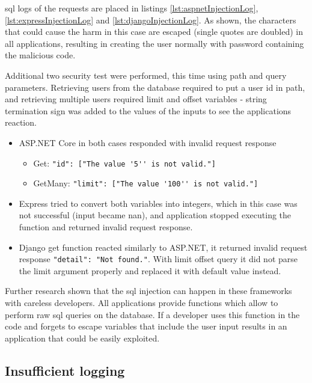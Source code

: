\acrshort{sql} logs of the requests are placed in listings \ref{lst:aspnetInjectionLog}, \ref{lst:expressInjectionLog} and \ref{lst:djangoInjectionLog}. As shown, the characters that could cause the harm in this case are escaped (single quotes are doubled) in all applications, resulting in creating the user normally with password containing the malicious code.




Additional two security test were performed, this time using path and query parameters. Retrieving users from the database required to put a user id in path, and retrieving multiple users required limit and offset variables - string termination sign was added to the values of the inputs to see the applications reaction.



\begin{itemize}
      \item ASP.NET Core in both cases responded with invalid request response
            \begin{itemize}
                  \item Get: \lstinline{"id": ["The value '5'' is not valid."]}
                  \item GetMany: \lstinline{"limit": ["The value '100'' is not valid."]}
            \end{itemize}
      \item Express tried to convert both variables into integers, which in this case was not successful (input became \acrshort{nan}), and application stopped executing the function and returned invalid request response.
      \item Django get function reacted similarly to ASP.NET, it returned invalid request response \lstinline{"detail": "Not found."}. With limit offset query it did not parse the limit argument properly and replaced it with default value instead.
\end{itemize}

Further research shown that the \acrshort{sql} injection can happen in these frameworks with careless developers. All applications provide functions which allow to perform raw \acrshort{sql} queries on the database. If a developer uses this function in the code and forgets to escape variables that include the user input results in an application that could be easily exploited.

\subsection{Insufficient logging}


